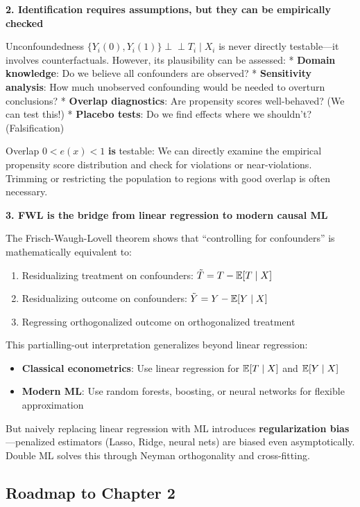 \textbf{2. Identification requires assumptions, but they can be
empirically checked}

Unconfoundedness \(\{Y_i(0), Y_i(1)\} \perp\!\!\!\perp T_i \mid X_i\) is
never directly testable---it involves counterfactuals. However, its
plausibility can be assessed: * \textbf{Domain knowledge}: Do we believe
all confounders are observed? * \textbf{Sensitivity analysis}: How much
unobserved confounding would be needed to overturn conclusions? *
\textbf{Overlap diagnostics}: Are propensity scores well-behaved? (We
can test this!) * \textbf{Placebo tests}: Do we find effects where we
shouldn't? (Falsification)

Overlap \(0 < e(x) < 1\) \textbf{is} testable: We can directly examine
the empirical propensity score distribution and check for violations or
near-violations. Trimming or restricting the population to regions with
good overlap is often necessary.

\textbf{3. FWL is the bridge from linear regression to modern causal ML}

The Frisch-Waugh-Lovell theorem shows that ``controlling for confounders''
is mathematically equivalent to:
\begin{enumerate}
\item Residualizing treatment on confounders: $\tilde{T} = T - \mathbb{E}[T \mid X]$
\item Residualizing outcome on confounders: $\tilde{Y} = Y - \mathbb{E}[Y \mid X]$
\item Regressing orthogonalized outcome on orthogonalized treatment
\end{enumerate}

This partialling-out interpretation generalizes beyond linear
regression:
\begin{itemize}
\item \textbf{Classical econometrics}: Use linear regression for
$\mathbb{E}[T \mid X]$ and $\mathbb{E}[Y \mid X]$
\item \textbf{Modern ML}: Use random forests, boosting, or neural networks for flexible approximation
\end{itemize}

But naively replacing linear regression with ML introduces
\textbf{regularization bias}---penalized estimators (Lasso, Ridge,
neural nets) are biased even asymptotically. Double ML solves this
through Neyman orthogonality and cross-fitting.

\subsection{Roadmap to Chapter 2}\label{_roadmap_to_chapter_2}

